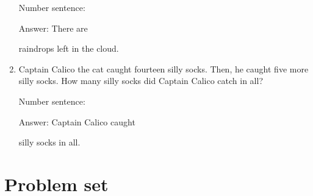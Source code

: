 \documentclass{tufte-book}
\begin{document}
\begin{enumerate}
  Number sentence:
  \dotfill\medskip\par
  Answer: There are
  \dotfill\medskip\par\mbox{}\dotfill\medskip\par\mbox{}\dotfill\bigskip
  raindrops left in the cloud.
\item
  Captain Calico the cat caught fourteen silly socks. Then, he caught
  five more silly socks. How many silly socks did Captain Calico catch
  in all?\medskip\par
  Number sentence:
  \dotfill\medskip\par
  Answer: Captain Calico caught
  \dotfill\medskip\par\mbox{}\dotfill\medskip\par\mbox{}\dotfill\bigskip
  silly socks in all.
\end{enumerate}



\clearpage\section{Problem set }
\end{document}
